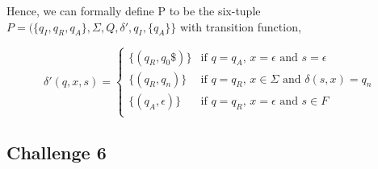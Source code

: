 \documentclass[12pt]{article}
\begin{document}
\bigskip
\noindent
Hence, we can formally define P to be the six-tuple $P=(\{q_I, q_R, q_A\}, \Sigma, Q, \delta', q_I, \{q_A\}\}$
with transition function,

\[
  \delta'(q, x, s) =
  \begin{cases}
  	\{(q_R, q_0\$)\}   & \text{if $q=q_A$, $x=\epsilon$ and $s=\epsilon$} \\
      \{(q_R, q_n)\}        & \text{if $q=q_R$, $x \in \Sigma$ and $\delta (s, x)=q_n$} \\
      \{(q_A, \epsilon)\} & \text{if $q=q_R$, $x=\epsilon$ and $s \in F$} \\
  \end{cases}
\]



\subsection*{Challenge 6}
\end{document}
